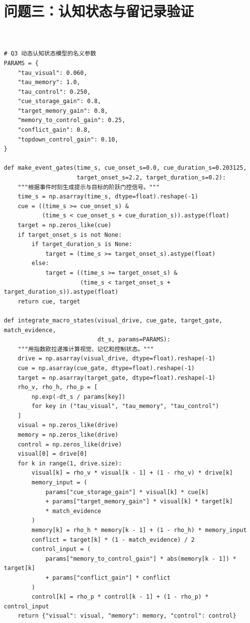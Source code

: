 \section{问题三：认知状态与留记录验证}
\begin{lstlisting}[style=appendixPython]


# Q3 动态认知状态模型的名义参数
PARAMS = {
    "tau_visual": 0.060,
    "tau_memory": 1.0,
    "tau_control": 0.250,
    "cue_storage_gain": 0.8,
    "target_memory_gain": 0.8,
    "memory_to_control_gain": 0.25,
    "conflict_gain": 0.8,
    "topdown_control_gain": 0.10,
}

def make_event_gates(time_s, cue_onset_s=0.0, cue_duration_s=0.203125,
                     target_onset_s=2.2, target_duration_s=0.2):
    """根据事件时刻生成提示与目标的阶跃门控信号。"""
    time_s = np.asarray(time_s, dtype=float).reshape(-1)
    cue = ((time_s >= cue_onset_s) &
           (time_s < cue_onset_s + cue_duration_s)).astype(float)
    target = np.zeros_like(cue)
    if target_onset_s is not None:
        if target_duration_s is None:
            target = (time_s >= target_onset_s).astype(float)
        else:
            target = ((time_s >= target_onset_s) &
                      (time_s < target_onset_s + target_duration_s)).astype(float)
    return cue, target

def integrate_macro_states(visual_drive, cue_gate, target_gate, match_evidence,
                           dt_s, params=PARAMS):
    """用指数欧拉递推计算视觉、记忆和控制状态。"""
    drive = np.asarray(visual_drive, dtype=float).reshape(-1)
    cue = np.asarray(cue_gate, dtype=float).reshape(-1)
    target = np.asarray(target_gate, dtype=float).reshape(-1)
    rho_v, rho_h, rho_p = [
        np.exp(-dt_s / params[key])
        for key in ("tau_visual", "tau_memory", "tau_control")
    ]
    visual = np.zeros_like(drive)
    memory = np.zeros_like(drive)
    control = np.zeros_like(drive)
    visual[0] = drive[0]
    for k in range(1, drive.size):
        visual[k] = rho_v * visual[k - 1] + (1 - rho_v) * drive[k]
        memory_input = (
            params["cue_storage_gain"] * visual[k] * cue[k]
            + params["target_memory_gain"] * visual[k] * target[k]
            * match_evidence
        )
        memory[k] = rho_h * memory[k - 1] + (1 - rho_h) * memory_input
        conflict = target[k] * (1 - match_evidence) / 2
        control_input = (
            params["memory_to_control_gain"] * abs(memory[k - 1]) * target[k]
            + params["conflict_gain"] * conflict
        )
        control[k] = rho_p * control[k - 1] + (1 - rho_p) * control_input
    return {"visual": visual, "memory": memory, "control": control}


\end{lstlisting}

